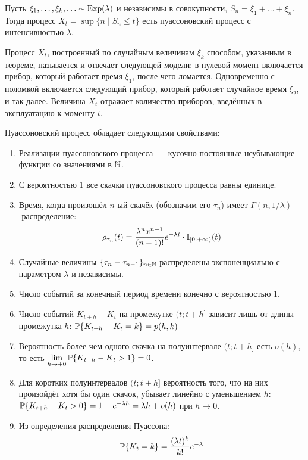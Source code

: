 \begin{theorem}
    \label{theorem:special:Poisson_process_explicit_definition}
    Пусть $ \xi_1, \ldots, \xi_k, \ldots \sim \textnormal{Exp}(\lambda) $ и независимы в совокупности,
    $ S_n = \xi_1 + \ldots + \xi_n $.
    Тогда процесс $ X_t = \sup \{ n \mid S_n \leqslant t \} $ есть пуассоновский процесс с интенсивностью $ \lambda $.
\end{theorem}

Процесс $ X_t $, построенный по случайным величинам $ \xi_k $ способом, указанным в теореме,
называется  и отвечает следующей модели:
в нулевой момент включается прибор, который работает время $ \xi_1 $, после чего ломается.
Одновременно с поломкой включается следующий прибор, который работает случайное время $ \xi_2 $, и так далее.
Величина $ X_t $ отражает количество приборов, введённых в эксплуатацию к моменту $ t $.

\begin{statement}
    \label{statement:special:Poisson_process_properties}
    Пуассоновский процесс обладает следующими свойствами:
    \begin{enumerate}
        \item
            Реализации пуассоновского процесса~--- кусочно-постоянные неубывающие функции со значениями в $ \mathbb{N} $.
        \item
            С вероятностью $ 1 $ все скачки пуассоновского процесса равны единице.
        \item
            Время, когда произошёл $ n $-ый скачёк (обозначим его $ \tau_n $) имеет $ \Gamma(n, 1/\lambda) $-распределение:
            \[
                \rho_{\tau_n}(t) = \frac{\lambda^n x^{n-1}}{(n-1)!} e^{-\lambda t} \cdot \mathbb{I}_{[0;+\infty)}(t)
            \]
        \item
            Случайные величины $ \{\tau_{n} - \tau_{n-1}\}_{n \in \mathbb{N}} $ распределены экспоненциально с параметром $ \lambda $ и независимы.
        \item
            Число событий за конечный период времени конечно с вероятностью $ 1 $.
        \item
            Число событий $ K_{t+h} - K_t $ на промежутке $ (t; t+h] $ зависит лишь от длины промежутка $ h $:
            $ \mathbb{P} \{ K_{t + h} - K_t = k \} = p(h, k) $
        \item
            Вероятность более чем одного скачка на полуинтервале $ (t; t + h] $ есть $ o(h) $,
            то есть $ \displaystyle \lim_{h \to +0} \mathbb{P} \{ K_{t+h} - K_t > 1 \} = 0 $.
        \item
            Для коротких полуинтервалов $ (t; t+h] $ вероятность того, что на них произойдёт хотя бы один скачок,
            убывает линейно с уменьшением $ h $: $ \mathbb{P} \{ K_{t+h} - K_t > 0 \} = 1 - e^{-\lambda h} = \lambda h + o(h) $ при $ h \to 0 $.
        \item
            Из определения распределения Пуассона:
            \[
                \mathbb{P}\{K_t = k\} = \frac{(\lambda t)^k}{k!} e^{-\lambda}
            \]
    \end{enumerate}
\end{statement}

